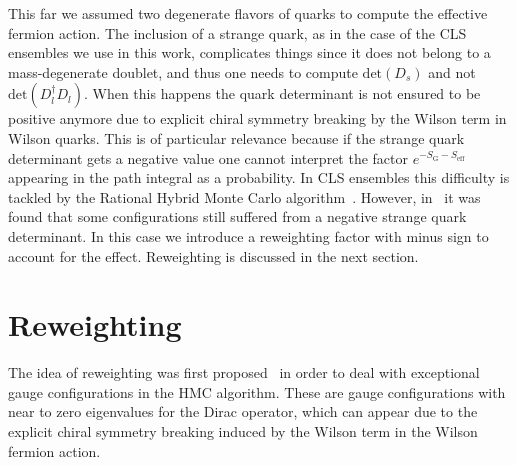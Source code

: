 This far we assumed two degenerate flavors of quarks to compute the effective fermion action. The inclusion of a strange quark, as in the case of the CLS ensembles we use in this work, complicates things since it does not belong to a mass-degenerate doublet, and thus one needs to compute $\textrm{det}(D_s)$ and not $\textrm{det}(D_l^{\dagger}D_l)$. When this happens the quark determinant is not ensured to be positive anymore due to explicit chiral symmetry breaking by the Wilson term in Wilson quarks. This is of particular relevance because if the strange quark determinant gets a negative value one cannot interpret the factor $e^{-S_{\textrm{G}}-S_{\textrm{eff}}}$ appearing in the path integral as a probability. In CLS ensembles this difficulty is tackled by the Rational Hybrid Monte Carlo algorithm~\citep{Kennedy:1998cu,Clark:2006fx}. However, in~\citep{Mohler:2020txx} it was found that some configurations still suffered from a negative strange quark determinant. In this case we introduce a reweighting factor with minus sign to account for the effect. Reweighting is discussed in the next section.

\section{Reweighting}

The idea of reweighting was first proposed~\citep{Luscher:2008tw} in order to deal with exceptional gauge configurations in the HMC algorithm. These are gauge configurations with near to zero eigenvalues for the Dirac operator, which can appear due to the explicit chiral symmetry breaking induced by the Wilson term in the Wilson fermion action.

